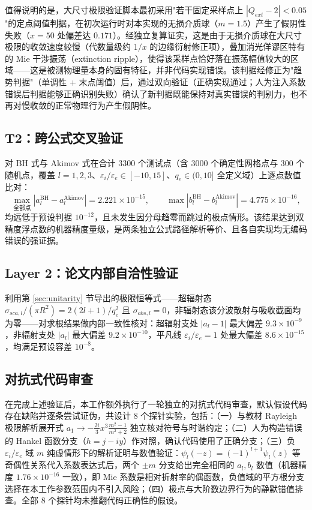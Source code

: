 \documentclass[12pt]{ctexart}
\begin{document}
值得说明的是，大尺寸极限验证脚本最初采用"若干固定采样点上 $|Q_{ext}-2|<0.05$"的定点阈值判据，在初次运行时对本实现的无损介质球（$m=1.5$）产生了假阴性失败（$x=50$ 处偏差达 $0.171$）。经独立复算证实，这是由于无损介质球在大尺寸极限的收敛速度较慢（代数量级约 $1/x$ 的边缘衍射修正项），叠加消光佯谬区特有的 Mie 干涉振荡（extinction ripple），使得该采样点恰好落在振荡幅值较大的区域——这是被测物理量本身的固有特征，并非代码实现错误。该判据经修正为"趋势判据"（单调性 + 末点阈值）后，通过双向验证（正确实现通过；人为注入系数错误后判据能够正确识别失败）确认了新判据既能保持对真实错误的判别力，也不再对慢收敛的正常物理行为产生假阴性。

\subsection{T2：跨公式交叉验证}
\label{sec:t2}

对 BH 式与 Akimov 式在合计 3300 个测试点（含 3000 个确定性网格点与 300 个随机点，覆盖 $l=1,2,3$、$\varepsilon_i/\varepsilon_e\in[-10,15]$、$q_e\in(0,10]$ 全定义域）上逐点数值比对：
\begin{equation}
\max_{\text{全部点}}\left|a_l^{\text{BH}} - a_l^{\text{Akimov}}\right| = 2.221\times10^{-15}, \qquad
\max\left|b_l^{\text{BH}} - b_l^{\text{Akimov}}\right| = 4.775\times10^{-16},
\end{equation}
均远低于预设判据 $10^{-12}$，且未发生因分母趋零而跳过的极点情形。该结果达到双精度浮点数的机器精度量级，是两条独立公式路径解析等价、且各自实现均无编码错误的强证据。

\subsection{Layer 2：论文内部自洽性验证}

利用第 \ref{sec:unitarity} 节导出的极限恒等式——超辐射态 $\sigma_{sca,l}/(\pi R^2) = 2(2l+1)/q_e^2$ 且 $\sigma_{abs,l}=0$，非辐射态该分波散射与吸收截面均为零——对求根结果做内部一致性核对：超辐射支处 $|a_l-1|$ 最大偏差 $9.3\times10^{-9}$，非辐射支处 $|a_l|$ 最大偏差 $9.2\times10^{-10}$，平凡线 $\varepsilon_i/\varepsilon_e=1$ 处最大偏差 $8.6\times10^{-15}$，均满足预设容差 $10^{-8}$。

\subsection{对抗式代码审查}

在完成上述验证后，本工作额外执行了一轮独立的对抗式代码审查，默认假设代码存在缺陷并逐条尝试证伪，共设计 8 个探针实验，包括：（一）与教材 Rayleigh 极限解析展开式 $a_1 \to -\tfrac{2i}{3}x^3\tfrac{m^2-1}{m^2+2}$ 独立核对符号与时谐约定；（二）人为构造错误的 Hankel 函数分支（$h=j-iy$）作对照，确认代码使用了正确分支；（三）负 $\varepsilon_i/\varepsilon_e$ 域 $m$ 纯虚情形下的解析证明与数值验证：$\psi_l(-z)=(-1)^{l+1}\psi_l(z)$ 等奇偶性关系代入系数表达式后，两个 $\pm m$ 分支给出完全相同的 $a_l,b_l$ 数值（机器精度 $1.76\times10^{-16}$ 一致），即 Mie 系数是相对折射率的偶函数，负值域的平方根分支选择在本工作参数范围内不引入风险；（四）极点与大阶数边界行为的静默错值排查。全部 8 个探针均未推翻代码正确性的假设。
\end{document}
